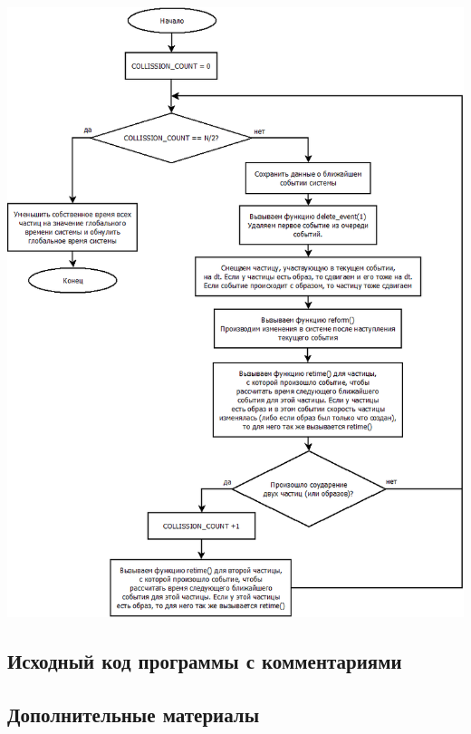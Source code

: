 \documentclass[a4paper]{article}
\begin{document}
\begin{center}
\includegraphics[scale=0.45]{step.png}
\end{center}


\begin{landscape}

\subsection{Исходный код программы с комментариями}



\end{landscape}
\subsection{Дополнительные материалы}
\end{document}
